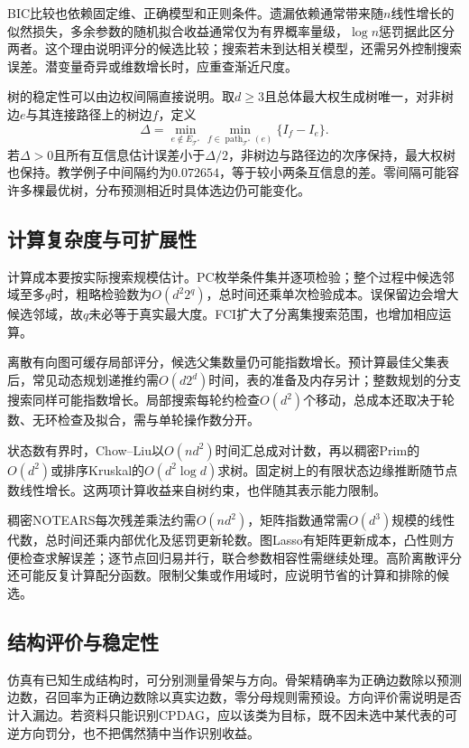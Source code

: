 BIC比较也依赖固定维、正确模型和正则条件。遗漏依赖通常带来随$n$线性增长的似然损失，多余参数的随机拟合收益通常仅为有界概率量级，$\log n$惩罚据此区分两者。这个理由说明评分的候选比较；搜索若未到达相关模型，还需另外控制搜索误差。潜变量奇异或维数增长时，应重查渐近尺度。

树的稳定性可以由边权间隔直接说明。取$d\geq3$且总体最大权生成树唯一，对非树边$e$与其连接路径上的树边$f$，定义
\[
  \Delta=\min_{e\notin E_{\mathcal{T}^{*}}}
             \min_{f\in\operatorname{path}_{\mathcal{T}^{*}}(e)}
             \{I_f-I_e\}.
\]
若$\Delta>0$且所有互信息估计误差小于$\Delta/2$，非树边与路径边的次序保持，最大权树也保持。教学例子中间隔约为$0.072654$，等于较小两条互信息的差。零间隔可能容许多棵最优树，分布预测相近时具体选边仍可能变化。

\subsection{计算复杂度与可扩展性}
\label{sec:pgm-structure-learning-complexity}

计算成本要按实际搜索规模估计。PC枚举条件集并逐项检验；整个过程中候选邻域至多$q$时，粗略检验数为$O(d^2 2^q)$，总时间还乘单次检验成本。误保留边会增大候选邻域，故$q$未必等于真实最大度。FCI扩大了分离集搜索范围，也增加相应运算。

离散有向图可缓存局部评分，候选父集数量仍可能指数增长。预计算最佳父集表后，常见动态规划递推约需$O(d2^d)$时间，表的准备及内存另计；整数规划的分支搜索同样可能指数增长。局部搜索每轮约检查$O(d^2)$个移动，总成本还取决于轮数、无环检查及拟合，需与单轮操作数分开。

状态数有界时，Chow--Liu以$O(nd^2)$时间汇总成对计数，再以稠密Prim的$O(d^2)$或排序Kruskal的$O(d^2\log d)$求树。固定树上的有限状态边缘推断随节点数线性增长。这两项计算收益来自树约束，也伴随其表示能力限制。

稠密NOTEARS每次残差乘法约需$O(nd^2)$，矩阵指数通常需$O(d^3)$规模的线性代数，总时间还乘内部优化及惩罚更新轮数。图Lasso有矩阵更新成本，凸性则方便检查求解误差；逐节点回归易并行，联合参数相容性需继续处理。高阶离散评分还可能反复计算配分函数。限制父集或作用域时，应说明节省的计算和排除的候选。

\subsection{结构评价与稳定性}
\label{sec:pgm-structure-learning-evaluation}

仿真有已知生成结构时，可分别测量骨架与方向。骨架精确率为正确边数除以预测边数，召回率为正确边数除以真实边数，零分母规则需预设。方向评价需说明是否计入漏边。若资料只能识别CPDAG，应以该类为目标，既不因未选中某代表的可逆方向罚分，也不把偶然猜中当作识别收益。

